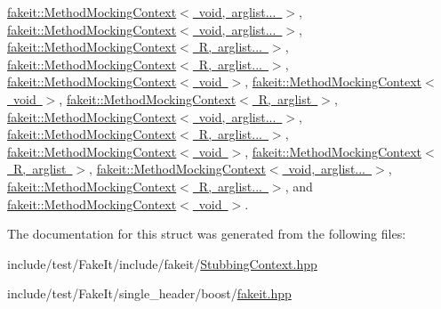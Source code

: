 \mbox{\hyperlink{classfakeit_1_1MethodMockingContext_ad413d04564c89fe134dfb7bae1a1f2a1}{fakeit\+::\+Method\+Mocking\+Context$<$ void, arglist... $>$}}, \mbox{\hyperlink{classfakeit_1_1MethodMockingContext_ad413d04564c89fe134dfb7bae1a1f2a1}{fakeit\+::\+Method\+Mocking\+Context$<$ void, arglist... $>$}}, \mbox{\hyperlink{classfakeit_1_1MethodMockingContext_ad413d04564c89fe134dfb7bae1a1f2a1}{fakeit\+::\+Method\+Mocking\+Context$<$ R, arglist... $>$}}, \mbox{\hyperlink{classfakeit_1_1MethodMockingContext_ad413d04564c89fe134dfb7bae1a1f2a1}{fakeit\+::\+Method\+Mocking\+Context$<$ R, arglist... $>$}}, \mbox{\hyperlink{classfakeit_1_1MethodMockingContext_ad413d04564c89fe134dfb7bae1a1f2a1}{fakeit\+::\+Method\+Mocking\+Context$<$ void $>$}}, \mbox{\hyperlink{classfakeit_1_1MethodMockingContext_ad413d04564c89fe134dfb7bae1a1f2a1}{fakeit\+::\+Method\+Mocking\+Context$<$ void $>$}}, \mbox{\hyperlink{classfakeit_1_1MethodMockingContext_ad413d04564c89fe134dfb7bae1a1f2a1}{fakeit\+::\+Method\+Mocking\+Context$<$ R, arglist $>$}}, \mbox{\hyperlink{classfakeit_1_1MethodMockingContext_ad413d04564c89fe134dfb7bae1a1f2a1}{fakeit\+::\+Method\+Mocking\+Context$<$ void, arglist... $>$}}, \mbox{\hyperlink{classfakeit_1_1MethodMockingContext_ad413d04564c89fe134dfb7bae1a1f2a1}{fakeit\+::\+Method\+Mocking\+Context$<$ R, arglist... $>$}}, \mbox{\hyperlink{classfakeit_1_1MethodMockingContext_ad413d04564c89fe134dfb7bae1a1f2a1}{fakeit\+::\+Method\+Mocking\+Context$<$ void $>$}}, \mbox{\hyperlink{classfakeit_1_1MethodMockingContext_ad413d04564c89fe134dfb7bae1a1f2a1}{fakeit\+::\+Method\+Mocking\+Context$<$ R, arglist $>$}}, \mbox{\hyperlink{classfakeit_1_1MethodMockingContext_ad413d04564c89fe134dfb7bae1a1f2a1}{fakeit\+::\+Method\+Mocking\+Context$<$ void, arglist... $>$}}, \mbox{\hyperlink{classfakeit_1_1MethodMockingContext_ad413d04564c89fe134dfb7bae1a1f2a1}{fakeit\+::\+Method\+Mocking\+Context$<$ R, arglist... $>$}}, and \mbox{\hyperlink{classfakeit_1_1MethodMockingContext_ad413d04564c89fe134dfb7bae1a1f2a1}{fakeit\+::\+Method\+Mocking\+Context$<$ void $>$}}.



The documentation for this struct was generated from the following files\+:\begin{DoxyCompactItemize}
\item 
include/test/\+Fake\+It/include/fakeit/\mbox{\hyperlink{StubbingContext_8hpp}{Stubbing\+Context.\+hpp}}\item 
include/test/\+Fake\+It/single\+\_\+header/boost/\mbox{\hyperlink{single__header_2boost_2fakeit_8hpp}{fakeit.\+hpp}}\end{DoxyCompactItemize}
